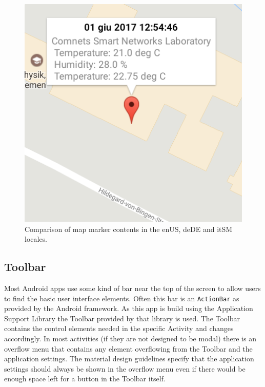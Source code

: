 \begin{figure}
\begin{minipage}{.3\textwidth}
  \includegraphics[width=.8\linewidth]{src/marker_it.png}
\end{minipage}
  \caption{Comparison of map marker contents in the en\textunderscore US, de\textunderscore DE and it\textunderscore SM locales.}
  \label{fig:lang_comp}
\end{figure}

\subsection{Toolbar}
Most Android apps use some kind of bar near the top of the screen to allow users to find the basic user interface elements. Often this bar is an \texttt{ActionBar} as provided by the Android framework. As this app is build using the Application Support Library the Toolbar provided by that library is used. The Toolbar contains the control elements needed in the specific Activity and changes accordingly. In most activities (if they are not designed to be modal) there is an overflow menu that contains any element overflowing from the Toolbar and the application settings. The material design guidelines specify that the application settings should always be shown in the overflow menu even if there would be enough space left for a button in the Toolbar itself.


